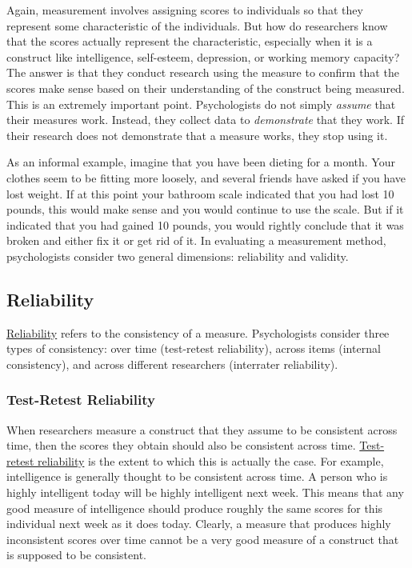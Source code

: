 \documentclass[
]{krantz}
\begin{document}
Again, measurement involves assigning scores to individuals so that they represent some characteristic of the individuals. But how do researchers know that the scores actually represent the characteristic, especially when it is a construct like intelligence, self-esteem, depression, or working memory capacity? The answer is that they conduct research using the measure to confirm that the scores make sense based on their understanding of the construct being measured. This is an extremely important point. Psychologists do not simply \emph{assume} that their measures work. Instead, they collect data to \emph{demonstrate} that they work. If their research does not demonstrate that a measure works, they stop using it.

As an informal example, imagine that you have been dieting for a month. Your clothes seem to be fitting more loosely, and several friends have asked if you have lost weight. If at this point your bathroom scale indicated that you had lost 10 pounds, this would make sense and you would continue to use the scale. But if it indicated that you had gained 10 pounds, you would rightly conclude that it was broken and either fix it or get rid of it. In evaluating a measurement method, psychologists consider two general dimensions: reliability and validity.

\hypertarget{reliability}{%
\subsection*{Reliability}\label{reliability}}


\protect\hyperlink{reliability-1}{Reliability} refers to the consistency of a measure. Psychologists consider three types of consistency: over time (test-retest reliability), across items (internal consistency), and across different researchers (interrater reliability).

\hypertarget{test-retest-reliability}{%
\subsubsection*{Test-Retest Reliability}\label{test-retest-reliability}}


When researchers measure a construct that they assume to be consistent across time, then the scores they obtain should also be consistent across time. \protect\hyperlink{test-retest-reliability-1}{Test-retest reliability} is the extent to which this is actually the case. For example, intelligence is generally thought to be consistent across time. A person who is highly intelligent today will be highly intelligent next week. This means that any good measure of intelligence should produce roughly the same scores for this individual next week as it does today. Clearly, a measure that produces highly inconsistent scores over time cannot be a very good measure of a construct that is supposed to be consistent.
\end{document}
